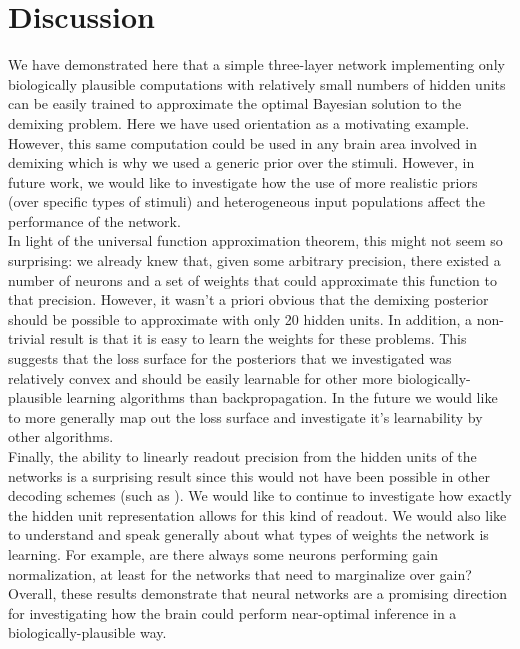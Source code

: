 \documentclass{article} %
\begin{document}
\section{Discussion}
We have demonstrated here that a simple three-layer network implementing only biologically plausible computations with relatively small numbers of hidden units can be easily trained to approximate the optimal Bayesian solution to the demixing problem. Here we have used orientation as a motivating example. However, this same computation could be used in any brain area involved in demixing which is why we used a generic prior over the stimuli. However, in future work, we would like to investigate how the use of more realistic priors (over specific types of stimuli) and heterogeneous input populations affect the performance of the network.
\\
In light of the universal function approximation theorem, this might not seem so surprising: we already knew that, given some arbitrary precision, there existed a number of neurons and a set of weights that could approximate this function to that precision. However, it wasn't a priori obvious that the demixing posterior should be possible to approximate with only 20 hidden units. In addition, a non-trivial result is that it is easy to learn the weights for these problems. This suggests that the loss surface for the posteriors that we investigated was relatively convex and should be easily learnable for other more biologically-plausible learning algorithms than backpropagation. In the future we would like to more generally map out the loss surface and investigate it's learnability by other algorithms. 
\\
Finally, the ability to linearly readout precision from the hidden units of the networks is a surprising result since this would not have been possible in other decoding schemes (such as \cite{Qamar10122013}). We would like to continue to investigate how exactly the hidden unit representation allows for this kind of readout. We would also like to understand and speak generally about what types of weights the network is learning. For example, are there always some neurons performing gain normalization, at least for the networks that need to marginalize over gain?
\\
Overall, these results demonstrate that neural networks are a promising direction for investigating how the brain could perform near-optimal inference in a biologically-plausible way.



\end{document}
